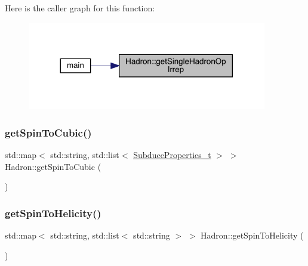 Here is the caller graph for this function\+:
\nopagebreak
\begin{figure}[H]
\begin{center}
\leavevmode
\includegraphics[width=296pt]{d1/daf/namespaceHadron_a9b05418ba46746a99fb402de358096d3_icgraph}
\end{center}
\end{figure}
\mbox{\label{namespaceHadron_a0ad570b7ce2fbc8f215d0a5ee08afdb2}} 
\subsubsection{\texorpdfstring{getSpinToCubic()}{getSpinToCubic()}}
{\footnotesize\ttfamily std\+::map$<$ std\+::string, std\+::list$<$ \mbox{\hyperlink{structHadron_1_1SubduceProperties__t}{Subduce\+Properties\+\_\+t}} $>$ $>$ Hadron\+::get\+Spin\+To\+Cubic (\begin{DoxyParamCaption}{ }\end{DoxyParamCaption})}

\mbox{\label{namespaceHadron_a65015bc93f8b83c79f094361b407ed28}} 
\subsubsection{\texorpdfstring{getSpinToHelicity()}{getSpinToHelicity()}}
{\footnotesize\ttfamily std\+::map$<$ std\+::string, std\+::list$<$ std\+::string $>$ $>$ Hadron\+::get\+Spin\+To\+Helicity (\begin{DoxyParamCaption}{ }\end{DoxyParamCaption})}

\mbox{\label{namespaceHadron_adfdd6762b0b73d56c308a674d4c0164d}} 
